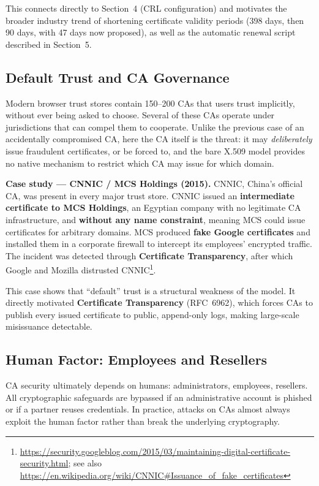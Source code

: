 \documentclass[10pt,twocolumn]{article}
\begin{document}
This connects directly to Section~4 (CRL configuration) and motivates the
broader industry trend of shortening certificate validity periods (398 days,
then 90 days, with 47 days now proposed), as well as the automatic renewal
script described in Section~5.

\subsection{Default Trust and CA Governance}

Modern browser trust stores contain 150--200 CAs that users trust
implicitly, without ever being asked to choose. Several of these CAs operate
under jurisdictions that can compel them to cooperate. Unlike the previous
case of an accidentally compromised CA, here the CA itself is the threat:
it may \emph{deliberately} issue fraudulent certificates, or be forced to,
and the bare X.509 model provides no native mechanism to restrict which CA
may issue for which domain.

\textbf{Case study --- CNNIC / MCS Holdings (2015).} CNNIC, China's official
CA, was present in every major trust store. CNNIC issued an
\textbf{intermediate certificate to MCS Holdings}, an Egyptian company with
no legitimate CA infrastructure, and \textbf{without any name constraint},
meaning MCS could issue certificates for arbitrary domains. MCS produced
\textbf{fake Google certificates} and installed them in a corporate firewall
to intercept its employees' encrypted traffic. The incident was detected
through \textbf{Certificate Transparency}, after which Google and Mozilla
distrusted CNNIC\footnote{\url{https://security.googleblog.com/2015/03/maintaining-digital-certificate-security.html}; see also \url{https://en.wikipedia.org/wiki/CNNIC\#Issuance_of_fake_certificates}}.

This case shows that ``default'' trust is a structural weakness of the
model. It directly motivated \textbf{Certificate Transparency} (RFC~6962),
which forces CAs to publish every issued certificate to public,
append-only logs, making large-scale misissuance detectable.

\subsection{Human Factor: Employees and Resellers}

CA security ultimately depends on humans: administrators, employees,
resellers. All cryptographic safeguards are bypassed if an administrative
account is phished or if a partner reuses credentials. In practice, attacks
on CAs almost always exploit the human factor rather than break the
underlying cryptography.
\end{document}
